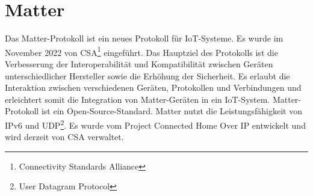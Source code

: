 \documentclass[12pt, a4paper]{article}
\begin{document}
\section{Matter}
\par Das Matter-Protokoll ist ein neues Protokoll für IoT-Systeme. Es wurde im November 2022 von CSA\footnote[2]{Connectivity Standards Alliance} eingeführt. Das Hauptziel des Protokolls ist die Verbesserung der Interoperabilität und Kompatibilität zwischen Geräten unterschiedlicher Hersteller sowie die Erhöhung der Sicherheit. Es erlaubt die Interaktion zwischen verschiedenen Geräten, Protokollen und Verbindungen und erleichtert somit die Integration von Matter-Geräten in ein IoT-System. Matter-Protokoll ist ein Open-Source-Standard. Matter nutzt die Leistungsfähigkeit von IPv6 und UDP\footnote[3]{User Datagram Protocol}. Es wurde vom Project Connected Home Over IP entwickelt und wird derzeit von CSA verwaltet. 
\end{document}
